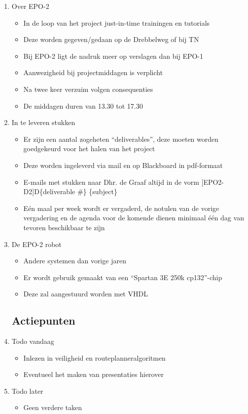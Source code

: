 \documentclass{article}
\begin{document}
\begin{enumerate}
	\item Over EPO-2
	\begin{itemize}
		\item In de loop van het project just-in-time trainingen en tutorials 
		\item Deze worden gegeven/gedaan op de Drebbelweg of bij TN
		\item Bij EPO-2 ligt de nadruk meer op verslagen dan bij EPO-1
		\item Aanwezigheid bij projectmiddagen is verplicht
		\item Na twee keer verzuim volgen consequenties
		\item De middagen duren van 13.30 tot 17.30
	\end{itemize}
		
	\item In te leveren stukken
	\begin{itemize}
		\item Er zijn een aantal zogeheten ``deliverables'', deze moeten worden goedgekeurd voor het halen van het project
		\item Deze worden ingeleverd via mail en op Blackboard in pdf-formaat
		\item E-mails met stukken naar Dhr. de Graaf altijd in de vorm [EPO2-D2]D\{deliverable \#\} \{subject\}
		\item Eén maal per week wordt er vergaderd, de notulen van de vorige vergadering en de agenda voor de komende dienen minimaal één dag van tevoren beschikbaar te zijn
	\end{itemize}

	\item De EPO-2 robot
	\begin{itemize}
		\item Andere systemen dan vorige jaren
		\item Er wordt gebruik gemaakt van een ``Spartan 3E 250k cp132''-chip
		\item Deze zal aangestuurd worden met VHDL
	\end{itemize}
	\subsection*{Actiepunten}
	\item Todo vandaag
	\begin{itemize}
		\item Inlezen in veiligheid en routeplanneralgoritmen
		\item Eventueel het maken van presentaties hierover
	\end{itemize}
	\item Todo later
	\begin{itemize}
		\item Geen verdere taken
	\end{itemize}


\end{enumerate}
\end{document}
